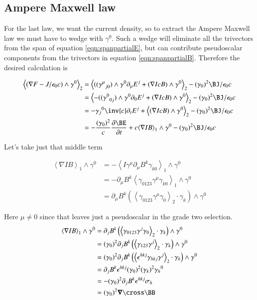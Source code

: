\documentclass{article}      %
\newcommand{\gpgrade}[2] {{\left\langle{{#1}}\right\rangle}_{#2}}
\newcommand{\gpgradetwo}[1] {\gpgrade{#1}{2}}
\newcommand{\gpgradeone}[1] {\gpgrade{#1}{1}}
\newcommand{\grad}[0]{\nabla}
\newcommand{\spacegrad}[0]{\boldsymbol{\nabla}}
\newcommand{\PD}[2]{\frac{\partial {#2}}{\partial {#1}}}
\begin{document}
\subsection{ Ampere Maxwell law }

For the last law, we want the current density, so to extract the Ampere Maxwell law we must have to wedge with $\gamma^0$.  Such a wedge will eliminate all the trivectors from the span of equation \ref{eqn:spanpartialE}, but can contribute pseudoscalar components from the trivectors in equation \ref{eqn:spanpartialB}.  Therefore the desired calculation is

\begin{align*}
\gpgradetwo{\left(\grad F - J/\epsilon_0 c\right) \wedge \gamma^0}
&= \gpgradetwo{ (({\gamma^{\mu}}_{j0}) \wedge \gamma^0 \partial_{\mu} E^j + (\grad I c B) \wedge \gamma^0 } - (\gamma_0)^2 \BJ/\epsilon_0 c \\
&= \gpgradetwo{ -(({\gamma^{0}}_{0j}) \wedge \gamma^0 \partial_{0} E^j + (\grad I c B) \wedge \gamma^0 } - (\gamma_0)^2 \BJ/\epsilon_0 c \\
&= -{\gamma_{j}}^0 \inv{c} \partial_t E^j + \gpgradetwo{ (\grad I c B) \wedge \gamma^0 } - (\gamma_0)^2 \BJ/\epsilon_0 c \\
&= - \frac{(\gamma_0)^2}{c} \PD{t}{\BE} + c \gpgradeone{ \grad I B} \wedge \gamma^0 - (\gamma_0)^2 \BJ/\epsilon_0 c \\
\end{align*}

Let's take just that middle term

\begin{align*}
\gpgradeone{ \grad I B } \wedge \gamma^0
&= -\gpgradeone{ I \gamma^{\mu} \partial_{\mu} B^k \gamma_{k0} } \wedge \gamma^0 \\
&= - \partial_{\mu} B^k \gpgradeone{ \gamma_{0123} \gamma^{\mu} \gamma_{k0} } \wedge \gamma^0 \\
&= \partial_{\mu} B^k \left(\gpgradetwo{ \gamma_{0123} \gamma^{\mu} \gamma_{0} } \cdot \gamma_k\right) \wedge \gamma^0
\end{align*}

Here $\mu \ne 0$ since that leaves just a pseudoscalar in the grade two selection.
\begin{align*}
\gpgradeone{ \grad I B } \wedge \gamma^0
&= \partial_{j} B^k \left(\gpgradetwo{ \gamma_{0123} \gamma^{j} \gamma_{0} } \cdot \gamma_k\right) \wedge \gamma^0 \\
&= (\gamma_0)^2 \partial_{j} B^k \left(\gpgradetwo{ \gamma_{123} \gamma^{j} } \cdot \gamma_k\right) \wedge \gamma^0 \\
&= (\gamma_0)^2 \partial_{j} B^k \left(\gpgradetwo{ \epsilon^{hkj}\gamma_{hkj} \gamma^{j} } \cdot \gamma_k\right) \wedge \gamma^0 \\
&= \partial_{j} B^k \epsilon^{hkj} (\gamma_0)^2 (\gamma_k)^2 {\gamma_{h}}^0 \\
&= - (\gamma_0)^2 \partial_{j} B^k \epsilon^{hkj} \sigma_h \\
&= (\gamma_0)^2 \spacegrad \cross \BB
\end{align*}
\end{document}
